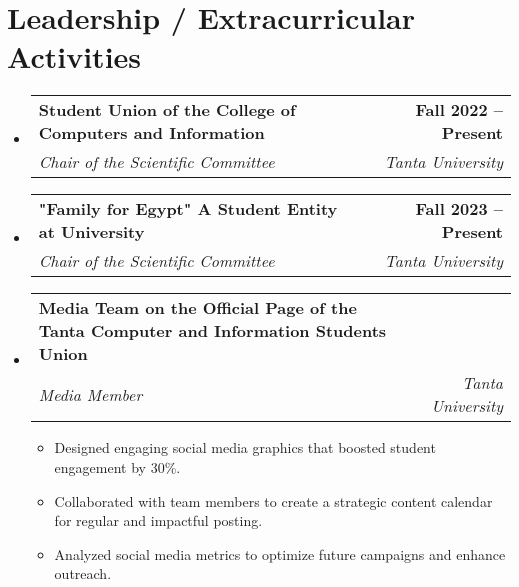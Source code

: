 \documentclass[letterpaper,11pt]{article}
\makeatletter
\newcommand{\resumeItem}[1]{
  \item\small{
    {#1 \vspace{-2pt}}
  }
}
\newcommand{\resumeSubheading}[4]{
  \vspace{-2pt}\item
    \begin{tabular*}{1.0\textwidth}[t]{l@{\extracolsep{\fill}}r}
      \textbf{#1} & \textbf{\small #2} \\
      \textit{\small#3} & \textit{\small #4} \\
    \end{tabular*}\vspace{-7pt}
}
\newcommand{\resumeSubHeadingListStart}{\begin{itemize}[leftmargin=0.0in, label={}]}
\newcommand{\resumeSubHeadingListEnd}{\end{itemize}}
\newcommand{\resumeItemListStart}{\begin{itemize}}
\newcommand{\resumeItemListEnd}{\end{itemize}\vspace{-5pt}}
\makeatother
\begin{document}
\section{Leadership / Extracurricular Activities}
\resumeSubHeadingListStart
    \resumeSubheading{Student Union of the College of Computers and Information}{Fall 2022 -- Present}
    {Chair of the Scientific Committee}{Tanta University}
    
    \resumeSubheading{"Family for Egypt" A Student Entity at University}{Fall 2023 -- Present}
    {Chair of the Scientific Committee}{Tanta University}

\resumeSubheading{Media Team on the Official Page of the Tanta Computer and Information Students Union}{}{Media Member \href{https://www.facebook.com/FCITUStudentUnion/posts/pfbid0gVqNnqsg43vtcHXkuPAr9RSEgsVUAijRtCCnKQdpnhQZYvBExtHMEteyF1bm4yjVl}{\faFacebookSquare}}{Tanta University}
\resumeItemListStart
    \resumeItem{Designed engaging social media graphics that boosted student engagement by 30\%.}
    \resumeItem{Collaborated with team members to create a strategic content calendar for regular and impactful posting.}
    \resumeItem{Analyzed social media metrics to optimize future campaigns and enhance outreach.}
\resumeItemListEnd

\resumeSubHeadingListEnd
\end{document}
